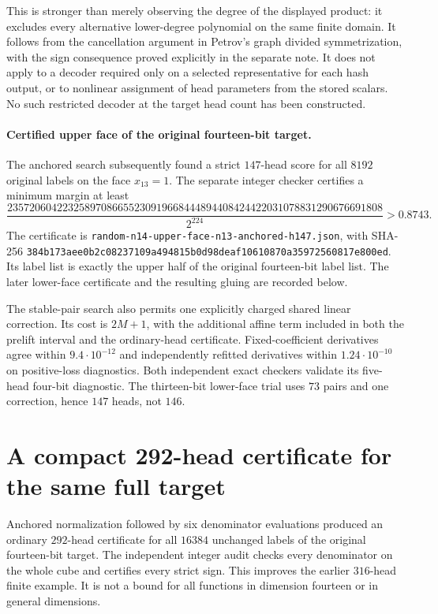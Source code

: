 \documentclass[11pt]{article}
\begin{document}
This is stronger than merely observing the degree of the displayed
product: it excludes every alternative lower-degree polynomial on the
same finite domain. It follows from the cancellation argument in
Petrov's graph divided symmetrization, with the sign consequence proved
explicitly in the separate note. It does not apply to a decoder required
only on a selected representative for each hash output, or to nonlinear
assignment of head parameters from the stored scalars. No such
restricted decoder at the target head count has been constructed.


\paragraph{Certified upper face of the original fourteen-bit target.}
The anchored search subsequently found a strict $147$-head score for
all $8192$ original labels on the face $x_{13}=1$. The separate integer
checker certifies a minimum margin at least
\[
 \frac{23572060422325897086655230919668444894408424422031078831290676691808}{2^{224}}
 >0.8743.
\]
The certificate is
\texttt{random-n14-upper-face-n13-anchored-h147.json}, with SHA-256
\texttt{384b173aee0b2c08237109a494815b0d98deaf10610870a35972560817e800ed}.
Its label list is exactly the upper half of the original fourteen-bit
label list. The later lower-face certificate and the resulting gluing
are recorded below.

The stable-pair search also permits one explicitly charged shared
linear correction. Its cost is $2M+1$, with the additional affine term
included in both the prelift interval and the ordinary-head certificate.
Fixed-coefficient derivatives agree within $9.4\cdot10^{-12}$ and
independently refitted derivatives within $1.24\cdot10^{-10}$ on
positive-loss diagnostics. Both independent exact checkers validate its
five-head four-bit diagnostic. The thirteen-bit lower-face trial uses
$73$ pairs and one correction, hence $147$ heads, not $146$.


\section{A compact 292-head certificate for the same full target}

Anchored normalization followed by six denominator evaluations produced
an ordinary $292$-head certificate for all $16384$ unchanged labels of
the original fourteen-bit target. The independent integer audit checks
every denominator on the whole cube and certifies every strict sign.
This improves the earlier $316$-head finite example. It is not a bound
for all functions in dimension fourteen or in general dimensions.
\end{document}
